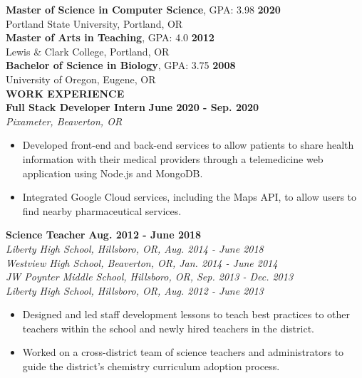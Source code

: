 \documentclass[11pt]{article}
\begin{document}
%
\textbf{Master of Science in Computer Science}, GPA: 3.98
\hfill \textbf{2020}\\ 
Portland State University, Portland, OR
\medskip \\
%
\textbf{Master of Arts in Teaching}, GPA: 4.0
\hfill \textbf{2012} \\
Lewis \& Clark College, Portland, OR
\medskip \\
%
\textbf{Bachelor of Science in Biology}, GPA: 3.75
\hfill \textbf{2008}\\
University of Oregon, Eugene, OR
\bigskip \\
\makebox[0pt][l]{\rule[-.2\baselineskip]{\linewidth}{.3mm}}%
\large{\textbf{WORK EXPERIENCE}}\smallskip \\
%
\textbf{Full Stack Developer Intern} \hfill \textbf{June 2020 - Sep. 2020}\\
\textit{Pixameter, Beaverton, OR}
\begin{itemize}[leftmargin=*, itemsep=0pt, topsep=5pt]
	\item Developed front-end and back-end services to allow patients to share health information with their medical providers through a telemedicine web application using Node.js and MongoDB.
	\item Integrated Google Cloud services, including the Maps API, to allow users to find nearby pharmaceutical services.
\end{itemize}
\medbreak \noindent
%
\textbf{Science Teacher} \hfill \textbf{Aug. 2012 - June 2018}\\
\textit{Liberty High School, Hillsboro, OR, Aug. 2014 - June 2018}\\
\textit{Westview High School, Beaverton, OR, Jan. 2014 - June 2014}\\
\textit{JW Poynter Middle School, Hillsboro, OR, Sep. 2013 - Dec. 2013}\\
\textit{Liberty High School, Hillsboro, OR, Aug. 2012 - June 2013}
\begin{itemize}[leftmargin=*, itemsep=0pt, topsep=5pt]
	\item Designed and led staff development lessons to teach best practices to other teachers within the school and newly hired teachers in the district.
	\item Worked on a cross-district team of science teachers and administrators to guide the district’s chemistry curriculum adoption process.
\end{itemize}
\end{document}
